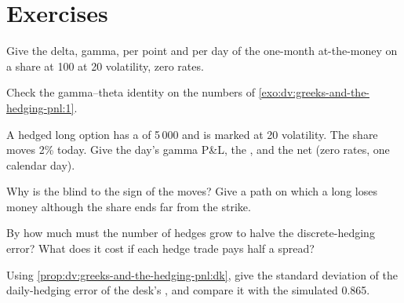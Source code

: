\section{Exercises}

\begin{exercise}[$\star$]\label{exo:dv:greeks-and-the-hedging-pnl:1}
Give the delta, gamma,  per point and  per day of the one-month
at-the-money  on a share at 100 at 20 volatility, zero rates.
\end{exercise}

\begin{exercise}[$\star$]\label{exo:dv:greeks-and-the-hedging-pnl:2}
Check the gamma--theta identity on the numbers of \cref{exo:dv:greeks-and-the-hedging-pnl:1}.
\end{exercise}

\begin{exercise}[$\star$]\label{exo:dv:greeks-and-the-hedging-pnl:3}
A hedged long option has a  of 5\,000 and is marked at 20 volatility.
The share moves 2\% today. Give the day's gamma P\&L, the , and the net (zero
rates, one calendar day).
\end{exercise}

\begin{exercise}[$\star\star$]\label{exo:dv:greeks-and-the-hedging-pnl:4}
Why is the  blind to the sign of the moves? Give a path on which a
long  loses money although the share ends far from the strike.
\end{exercise}

\begin{exercise}[$\star\star$]\label{exo:dv:greeks-and-the-hedging-pnl:5}
By how much must the number of hedges grow to halve the discrete-hedging error?
What does it cost if each hedge trade pays half a spread?
\end{exercise}

\begin{exercise}[$\star\star$]\label{exo:dv:greeks-and-the-hedging-pnl:6}
Using \cref{prop:dv:greeks-and-the-hedging-pnl:dk}, give the standard deviation of
the daily-hedging error of the desk's , and compare it with the simulated
0.865.
\end{exercise}


